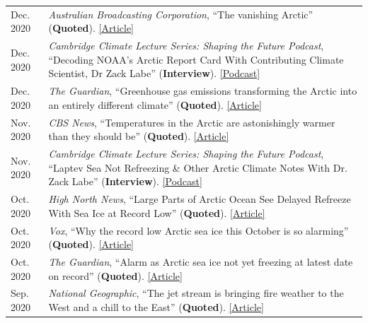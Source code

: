 \documentclass[margin,line,palatino,courier,10pt]{res}
\begin{document}
\begin{resume}
\begin{tabular}{@{}p{0.9in}p{4in}}
\end{tabular}
\begin{tabular}{@{}p{0.9in}p{4in}}
Dec. 2020 & \textit{Australian Broadcasting Corporation}, ``The vanishing Arctic'' (\textbf{Quoted}). \href{https://www.abc.net.au/news/2020-12-16/arctic-sea-ice-dramatic-transformation-as-seen-by-satellites/12961584?nw=0}{[Article]}\\
Dec. 2020 & \textit{Cambridge Climate Lecture Series: Shaping the Future Podcast}, ``Decoding NOAA's Arctic Report Card With Contributing Climate Scientist, Dr Zack Labe'' (\textbf{Interview}). \href{https://climateseries.com/climate-change-podcast/80-arctic-report-card-zack-labe}{[Podcast]}\\
Dec. 2020 & \textit{The Guardian}, ``Greenhouse gas emissions transforming the Arctic into an entirely different climate'' (\textbf{Quoted}). \href{https://www.theguardian.com/world/2020/dec/08/arctic-report-climate-crisis-wildfires-ice-loss}{[Article]}\\
Nov. 2020 & \textit{CBS News}, ``Temperatures in the Arctic are astonishingly warmer than they should be'' (\textbf{Quoted}). \href{https://www.cbsnews.com/news/climate-change-arctic-temperatures-warmer/}{[Article]}\\
Nov. 2020 & \textit{Cambridge Climate Lecture Series: Shaping the Future Podcast}, ``Laptev Sea Not Refreezing \& Other Arctic Climate Notes With Dr. Zack Labe'' (\textbf{Interview}). \href{https://climateseries.com/climate-change-podcast/74-dr-zack-labe-arctic-laptev-sea}{[Podcast]}\\
Oct. 2020 & \textit{High North News}, ``Large Parts of Arctic Ocean See Delayed Refreeze With Sea Ice at Record Low'' (\textbf{Quoted}). \href{https://www.highnorthnews.com/en/large-parts-arctic-ocean-see-delayed-refreeze-sea-ice-record-low}{[Article]}\\
Oct. 2020 & \textit{Vox}, ``Why the record low Arctic sea ice this October is so alarming'' (\textbf{Quoted}). \href{https://www.vox.com/21536859/arctic-sea-ice-2020-climate-change-alaska-polar-bears-charts}{[Article]}\\
Oct. 2020 & \textit{The Guardian}, ``Alarm as Arctic sea ice not yet freezing at latest date on record'' (\textbf{Quoted}). \href{https://www.theguardian.com/world/2020/oct/22/alarm-as-arctic-sea-ice-not-yet-freezing-at-latest-date-on-record}{[Article]}\\
Sep. 2020 & \textit{National Geographic}, ``The jet stream is bringing fire weather to the West and a chill to the East'' (\textbf{Quoted}). \href{https://www.nationalgeographic.com/science/2020/09/jet-stream-fire-weather-california-chill-eastern-us/}{[Article]}\\

\end{tabular}
\end{resume}
\end{document}
